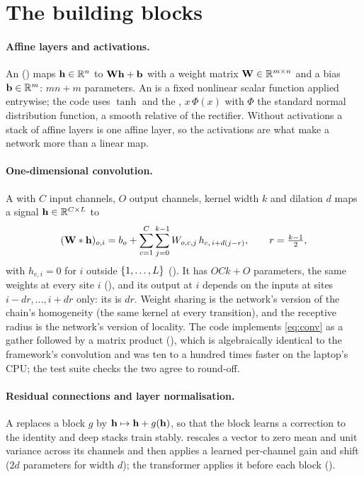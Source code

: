 \section{The building blocks}
\label{sec:blocks}

\paragraph{Affine layers and activations.}
An  () maps $\mathbf{h}\in\mathbb{R}^{n}$ to
$\mathbf{W}\mathbf{h}+\mathbf{b}$ with a weight matrix $\mathbf{W}\in\mathbb{R}^{m\times n}$ and a bias
$\mathbf{b}\in\mathbb{R}^m$: $mn+m$ parameters. An  is a fixed nonlinear
scalar function applied entrywise; the code uses $\tanh$ and the ,
$x\,\Phi(x)$ with $\Phi$ the standard normal distribution function, a smooth relative of
the rectifier. Without activations a stack of affine layers is one affine layer, so the
activations are what make a network more than a linear map.

\paragraph{One-dimensional convolution.}
A  with $C$ input channels, $O$ output channels, kernel width $k$
and dilation $d$ maps a signal $\mathbf{h}\in\mathbb{R}^{C\times L}$ to
\begin{equation}
  (\mathbf{W}\ast\mathbf{h})_{o,i}=b_o+\sum_{c=1}^{C}\sum_{j=0}^{k-1}W_{o,c,j}\,h_{c,\,i+d(j-r)},
  \qquad r=\tfrac{k-1}2,
  \label{eq:conv}
\end{equation}
with $h_{c,i}=0$ for $i$ outside $\{1,\dots,L\}$ (). It has
$OCk+O$ parameters, the same weights at every site $i$ (), and its
output at $i$ depends on the inputs at sites $i-dr,\dots,i+dr$ only: its
 is $dr$. Weight sharing is the network's version of the chain's
homogeneity (the same kernel at every transition), and the receptive radius is the
network's version of locality. The code implements \cref{eq:conv} as a gather followed by
a matrix product (), which is algebraically identical to the framework's
convolution and was ten to a hundred times faster on the laptop's CPU; the test suite
checks the two agree to round-off.

\paragraph{Residual connections and layer normalisation.}
A  replaces a block $g$ by $\mathbf{h}\mapsto\mathbf{h}+g(\mathbf{h})$,
so that the block learns a correction to the identity and deep stacks train stably.
 rescales a vector to zero mean and unit variance across its
channels and then applies a learned per-channel gain and shift ($2d$ parameters for
width $d$); the transformer applies it before each block ().

